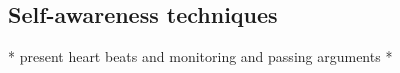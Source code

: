 \subsection{Self-awareness techniques}
\label{sec:selfawareness}

* present heart beats and monitoring and passing arguments *